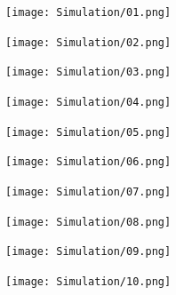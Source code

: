 \begin{figure}[H]

\begin{subfigure}{0.48\textwidth}
\texttt{[image: Simulation/01.png]}
\caption{} \label{fig:simulation_01}
\end{subfigure}\hspace*{\fill}
\begin{subfigure}{0.48\textwidth}
\texttt{[image: Simulation/02.png]}
\caption{} \label{fig:simulation_02}
\end{subfigure}

\medskip

\begin{subfigure}{0.48\textwidth}
\texttt{[image: Simulation/03.png]}
\caption{} \label{fig:simulation_03}
\end{subfigure}\hspace*{\fill}
\begin{subfigure}{0.48\textwidth}
\texttt{[image: Simulation/04.png]}
\caption{} \label{fig:simulation_04}
\end{subfigure}

\medskip

\begin{subfigure}{0.48\textwidth}
\texttt{[image: Simulation/05.png]}
\caption{} \label{fig:simulation_05}
\end{subfigure}\hspace*{\fill}
\begin{subfigure}{0.48\textwidth}
\texttt{[image: Simulation/06.png]}
\caption{} \label{fig:simulation_06}
\end{subfigure}

\medskip

\begin{subfigure}{0.48\textwidth}
\texttt{[image: Simulation/07.png]}
\caption{} \label{fig:simulation_07}
\end{subfigure}\hspace*{\fill}
\begin{subfigure}{0.48\textwidth}
\texttt{[image: Simulation/08.png]}
\caption{} \label{fig:simulation_08}
\end{subfigure}

\medskip

\begin{subfigure}{0.48\textwidth}
\texttt{[image: Simulation/09.png]}
\caption{} \label{fig:simulation_09}
\end{subfigure}\hspace*{\fill}
\begin{subfigure}{0.48\textwidth}
\texttt{[image: Simulation/10.png]}
\caption{} \label{fig:simulation_10}
\end{subfigure}


\end{figure}
